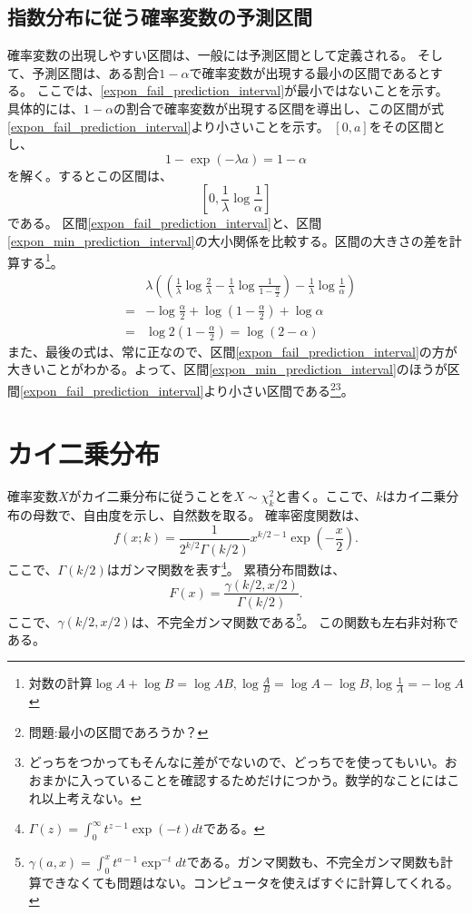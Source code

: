 \subsection{指数分布に従う確率変数の予測区間}
確率変数の出現しやすい区間は、一般には予測区間として定義される。
そして、予測区間は、ある割合$1-\alpha$で確率変数が出現する最小の区間であるとする。
ここでは、\ref{expon_fail_prediction_interval}が最小ではないことを示す。
具体的には、$1-\alpha$の割合で確率変数が出現する区間を導出し、この区間が式\ref{expon_fail_prediction_interval}より小さいことを示す。
$[0,a]$をその区間とし、
\begin{equation*}
 1-\exp(-\lambda a) = 1-\alpha
\end{equation*}
を解く。するとこの区間は、
\begin{equation*}\label{expon_min_prediction_interval}
\left[0,\frac{1}{\lambda}\log\frac{1}{\alpha} \right]
 \end{equation*}
である。
区間\ref{expon_fail_prediction_interval}と、区間\ref{expon_min_prediction_interval}の大小関係を比較する。区間の大きさの差を計算する\footnote{対数の計算$\log A+\log B=\log AB,\log \frac{A}{B}= \log A-\log B$,$\log \frac{1}{A}=-\log A$}。
\begin{eqnarray*}
 & &\lambda \left( (\frac{1}{\lambda}\log\frac{2}{\lambda}-\frac{1}{\lambda}\log\frac{1}{1-\frac{\alpha}{2}})-\frac{1}{\lambda}\log\frac{1}{\alpha} \right)\\
&=& -\log\frac{\alpha}{2}+\log\left(1-\frac{\alpha}{2}\right)+\log\alpha \\
&=& \log2\left(1-\frac{\alpha}{2}\right) = \log(2-\alpha)
\end{eqnarray*}
また、最後の式は、常に正なので、区間\ref{expon_fail_prediction_interval}の方が大きいことがわかる。よって、区間\ref{expon_min_prediction_interval}のほうが区間\ref{expon_fail_prediction_interval}より小さい区間である\footnote{問題:最小の区間であろうか？}\footnote{どっちをつかってもそんなに差がでないので、どっちでを使ってもいい。おおまかに入っていることを確認するためだけにつかう。数学的なことにはこれ以上考えない。}。


\section{カイ二乗分布}
確率変数$X$がカイ二乗分布に従うことを$X \sim \chi^2_k$と書く。ここで、$k$はカイ二乗分布の母数で、自由度を示し、自然数を取る。
確率密度関数は、
\begin{equation*}
    f(x;k) = \frac{1}{2^{k/2}\Gamma(k/2)}x^{k/2-1}\exp\left(-\frac{x}{2}\right).
\end{equation*}
ここで、$\Gamma(k/2)$はガンマ関数を表す\footnote{$ \Gamma(z)=\int_0^{\infty }t^{z-1}\exp(-t)dt$である。 }。
累積分布間数は、
\begin{equation*}
    F(x) = \frac{\gamma(k/2,x/2)}{\Gamma(k/2)}.
\end{equation*}
ここで、$\gamma(k/2,x/2)$は、不完全ガンマ関数である\footnote{$\gamma(a,x)=\int_0^x t^{a-1}\exp^{-t}dt$である。ガンマ関数も、不完全ガンマ関数も計算できなくても問題はない。コンピュータを使えばすぐに計算してくれる。}。
この関数も左右非対称である。


